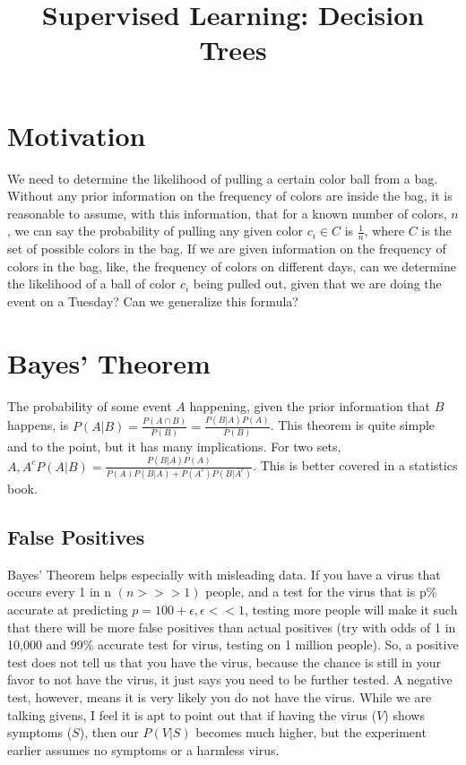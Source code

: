 \documentclass{article}
\title{Supervised Learning: Decision Trees}
\begin{document}
\maketitle
\section{Motivation}
We need to determine the likelihood of pulling a certain color ball from a bag. Without any prior information on the frequency of colors are inside the bag, it is reasonable to assume, with this information, that for a known number of colors, $n$, we can say the probability of pulling any given color $c_i\in C$ is $\frac{1}{n}$, where $C$ is the set of possible colors in the bag. If we are given information on the frequency of colors in the bag, like, the frequency of colors on different days, can we determine the likelihood of a ball of color $c_i$ being pulled out, given that we are doing the event on a Tuesday? Can we generalize this formula?

\section{Bayes' Theorem}
The probability of some event $A$ happening, given the prior information that $B$ happens, is $P(A|B) = \frac{P(A\cap B)}{P(B)} = \frac{P(B|A)P(A)}{P(B)}$. This theorem is quite simple and to the point, but it has many implications. For two sets, $A, A^c P(A|B) =  \frac{P(B|A)P(A)}{P(A)P(B|A) + P(A^c)P(B|A^c)}$. This is better covered in a statistics book. %

\subsection{False Positives}
Bayes' Theorem helps especially with misleading data. If you have a virus that occurs every 1 in n $(n >>> 1)$ people, and a test for the virus that is p\% accurate at predicting $p = 100 + \epsilon, \epsilon << 1$, testing more people will make it such that there will be more false positives than actual positives (try with odds of 1 in 10,000 and 99\% accurate test for virus, testing on 1 million people). So, a positive test does not tell us that you have the virus, because the chance is still in your favor to not have the virus, it just says you need to be further tested. A negative test, however, means it is very likely you do not have the virus. While we are talking givens, I feel it is apt to point out that if having the virus ($V$) shows symptoms ($S$), then our $P(V|S)$ becomes much higher, but the experiment earlier assumes no symptoms or a harmless virus. 
\end{document}
